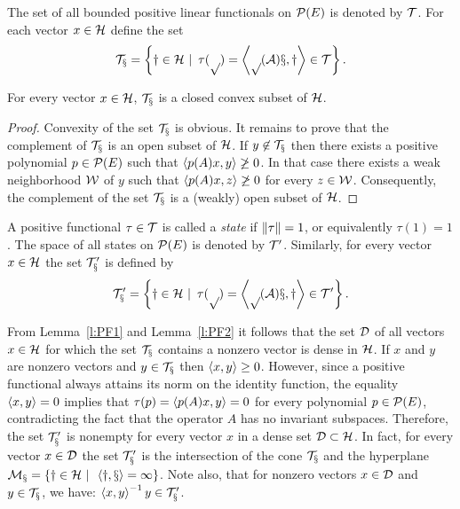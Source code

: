 \begin{defn}
The set of all bounded positive linear functionals on ${\cal{P}}(E)$
is denoted by $\cal T$. For each vector $x\in{\cal H}$ define the set
\[ \cal{T}_x = \left\{y\in{\cal H}\,\,|\,\,\,
               \tau(p) = \left<p(A)x,y\right> \in \cal{T}\right\}. \]
\end{defn}

\begin{lem} \label{l:PF3}
For every vector $x\in{\cal H}$, $\cal{T}_x$ is a closed convex
subset of ${\cal H}$.
\end{lem}

\begin{proof}
Convexity of the set $\cal T_x$ is obvious. It remains to prove
that the complement of $\cal T_x$ is an open subset of ${\cal H}$. If
$y\not\in\cal{T}_x$ then there exists a positive polynomial
$p\in{\cal{P}}(E)$ such that $\left<p(A)x, y\right> \not\geq 0$. In that case
there exists a weak neighborhood $\cal W$ of $y$ such that
$\left<p(A)x,z\right>\not\geq0$ for every $z\in\cal W$. Consequently,
the complement of the set $\cal T_x$ is a (weakly) open subset
of ${\cal H}$.
\end{proof}

\begin{defn}
A positive functional $\tau\in\cal{T}$ is called a \emph{state}
if $\left\Vert\tau\right\Vert=1$, or equivalently $\tau(1)=1$. The space of
all states on ${\cal{P}}(E)$ is denoted by $\cal{T}'$. Similarly, for
every vector $x\in{\cal H}$ the set $\cal{T}'_x$ is defined by
\[ \cal{T}'_x = \left\{y\in{\cal H}\,\,|\,\,\, \tau(p) =
   \left<p(A)x,y\right> \in \cal{T}'\right\}. \]
\end{defn}

\begin{rem}
From Lemma~\ref{l:PF1} and Lemma~\ref{l:PF2} it follows that
the set ${\cal{D}}$ of all vectors $x\in{\cal H}$ for which the set
$\cal{T}_x$ contains a nonzero vector is dense in ${\cal H}$. If $x$
and $y$ are nonzero vectors and $y\in\cal{T}_x$ then
$\left<x,y\right>\geq0$. However, since a positive functional always
attains its norm on the identity function, the equality
$\left<x,y\right>=0$ implies that $\tau(p)=\left<p(A)x,y\right>=0$ for every
polynomial $p\in{\cal{P}}(E)$, contradicting the fact that the
operator $A$ has no invariant subspaces. Therefore, the set
$\cal{T}'_x$ is nonempty for every vector $x$ in a dense set
${\cal{D}}\subset{\cal H}$. In fact, for every vector $x\in{\cal{D}}$ the set
$\cal{T}'_x$ is the intersection of the cone $\cal{T}_x$ and
the hyperplane $\cal{M}_x=\left\{y\in{\cal H}\,\,|\,\,\,\left<y,x\right>=1\right\}$.
Note also, that for nonzero vectors $x\in{\cal{D}}$ and
$y\in\cal{T}_x$, we have: $\left<x,y\right>^{-1}y\in\cal{T}'_x$.
\end{rem}

